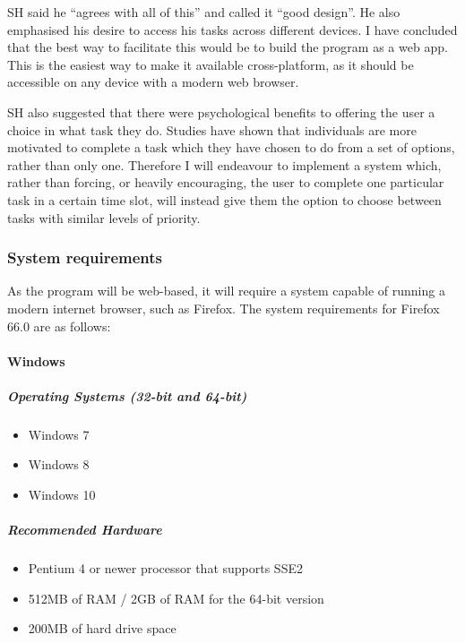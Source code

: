 \documentclass[]{article}
\let\oldparagraph\paragraph
\renewcommand{\paragraph}[1]{\oldparagraph{#1}\mbox{}}
\let\oldsubparagraph\subparagraph
\renewcommand{\subparagraph}[1]{\oldsubparagraph{#1}\mbox{}}
\begin{document}
SH said he ``agrees with all of this'' and called it ``good design''. He
also emphasised his desire to access his tasks across different devices.
I have concluded that the best way to facilitate this would be to build
the program as a web app. This is the easiest way to make it available
cross-platform, as it should be accessible on any device with a modern
web browser.

SH also suggested that there were psychological benefits to offering the
user a choice in what task they do. Studies have shown that individuals
are more motivated to complete a task which they have chosen to do from
a set of options, rather than only one. Therefore I will endeavour to
implement a system which, rather than forcing, or heavily encouraging,
the user to complete one particular task in a certain time slot, will
instead give them the option to choose between tasks with similar levels
of priority.

\hypertarget{system-requirements}{%
\subsubsection{System requirements}\label{system-requirements}}

As the program will be web-based, it will require a system capable of
running a modern internet browser, such as Firefox. The system
requirements for Firefox 66.0 are as follows:

\hypertarget{windows}{%
\paragraph{Windows}\label{windows}}

\hypertarget{operating-systems-32-bit-and-64-bit}{%
\subparagraph{Operating Systems (32-bit and
64-bit)}\label{operating-systems-32-bit-and-64-bit}}

\begin{itemize}
\item
  Windows 7
\item
  Windows 8
\item
  Windows 10
\end{itemize}

\hypertarget{recommended-hardware}{%
\subparagraph{Recommended Hardware}\label{recommended-hardware}}

\begin{itemize}
\item
  Pentium 4 or newer processor that supports SSE2
\item
  512MB of RAM / 2GB of RAM for the 64-bit version
\item
  200MB of hard drive space
\end{itemize}
\end{document}

